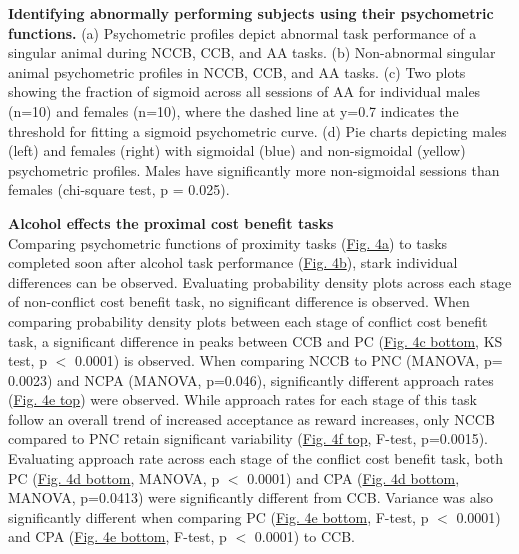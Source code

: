 \documentclass{article}
\begin{document}
\captionsetup{type=figure}
\caption{\textbf{Identifying abnormally performing subjects using their psychometric functions.} (a) Psychometric profiles depict abnormal task performance of a singular animal during NCCB, CCB, and AA tasks. (b) Non-abnormal singular animal psychometric profiles in NCCB, CCB, and AA tasks. (c) Two plots showing the fraction of sigmoid across all sessions of AA for individual males (n=10) and females (n=10), where the dashed line at y=0.7 indicates the threshold for fitting a sigmoid psychometric curve. (d) Pie charts depicting males (left) and females (right) with sigmoidal (blue) and non-sigmoidal (yellow) psychometric profiles. Males have significantly more non-sigmoidal sessions than females (chi-square test, p = 0.025).}
\label{fig:alcohol_main_3}

\vspace{1em}

\noindent\textbf{Alcohol effects the proximal cost benefit tasks}\\
Comparing psychometric functions of proximity tasks (\hyperref[fig:alcohol_main_4]{Fig. 4a}) to tasks completed soon after alcohol task performance (\hyperref[fig:alcohol_main_4]{Fig. 4b}), stark individual differences can be observed. Evaluating probability density plots across each stage of non-conflict cost benefit task, no significant difference is observed. When comparing probability density plots between each stage of conflict cost benefit task, a significant difference in peaks between CCB and PC (\hyperref[fig:alcohol_main_4]{Fig. 4c bottom}, KS test, p $<$ 0.0001) is observed. When comparing NCCB to PNC (MANOVA, p= 0.0023) and NCPA (MANOVA, p=0.046), significantly different approach rates (\hyperref[fig:alcohol_main_4]{Fig. 4e top}) were observed. While approach rates for each stage of this task follow an overall trend of increased acceptance as reward increases, only NCCB compared to PNC retain significant variability (\hyperref[fig:alcohol_main_4]{Fig. 4f top}, F-test, p=0.0015). Evaluating approach rate across each stage of the conflict cost benefit task, both PC (\hyperref[fig:alcohol_main_4]{Fig. 4d bottom}, MANOVA, p $<$ 0.0001) and CPA (\hyperref[fig:alcohol_main_4]{Fig. 4d bottom}, MANOVA, p=0.0413) were significantly different from CCB. Variance was also significantly different when comparing PC (\hyperref[fig:alcohol_main_4]{Fig. 4e bottom}, F-test, p $<$ 0.0001) and CPA (\hyperref[fig:alcohol_main_4]{Fig. 4e bottom}, F-test, p $<$ 0.0001) to CCB.
\end{document}
